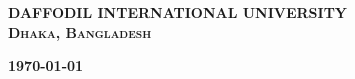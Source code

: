 \begin{titlepage}
\begin{center}
	\Large\textbf{DAFFODIL INTERNATIONAL UNIVERSITY}\\
 \textbf{\textsc{Dhaka, Bangladesh}}
\end{center}

\begin{center}
\textbf{\today}
\end{center}

\end{titlepage}
